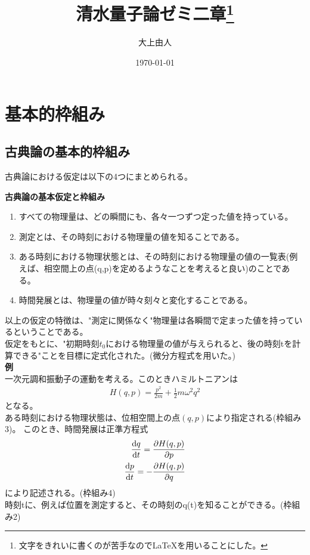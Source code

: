 \documentclass[a4paper,11pt]{jsarticle}
\begin{document}
\title{清水量子論ゼミ二章\footnote{文字をきれいに書くのが苦手なので\LaTeX を用いることにした。}}
\author{大上由人}
\date{\today}
\maketitle

\section{基本的枠組み}
\subsection{古典論の基本的枠組み}
古典論における仮定は以下の4つにまとめられる。
\begin{itembox}[l]{\textbf{古典論の基本仮定と枠組み}}
  \begin{enumerate}
 \item すべての物理量は、どの瞬間にも、各々一つずつ定った値を持っている。\\
 \item  測定とは、その時刻における物理量の値を知ることである。\\
 \item ある時刻における物理状態とは、その時刻における物理量の値の一覧表(例えば、相空間上の点(q,p)を定めるようなことを考えると良い)のことである。\\
 \item 時間発展とは、物理量の値が時々刻々と変化することである。
  \end{enumerate}
\end{itembox}
以上の仮定の特徴は、"測定に関係なく"物理量は各瞬間で定まった値を持っているということである。\\
仮定をもとに、"初期時刻$t_0$における物理量の値が与えられると、後の時刻tを計算できる"ことを目標に定式化された。(微分方程式を用いた。)\\
\textbf{例}\\
一次元調和振動子の運動を考える。このときハミルトニアンは\\
\begin{align}
H(q,p)=\frac{p^2}{2m}+\frac{1}{2}m\omega ^2 q^2
\end{align}
となる。\\
ある時刻における物理状態は、位相空間上の点$(q,p)$により指定される(枠組み3)。
このとき、時間発展は正準方程式
\begin{align}
\dv{q}{t}=\pdv{H(q,p)}{p}\\
\dv{p}{t}=-\pdv{H(q,p)}{q}
\end{align}
により記述される。(枠組み4)\\
時刻tに、例えば位置を測定すると、その時刻のq(t)を知ることができる。(枠組み2)
\bigskip
\end{document}
